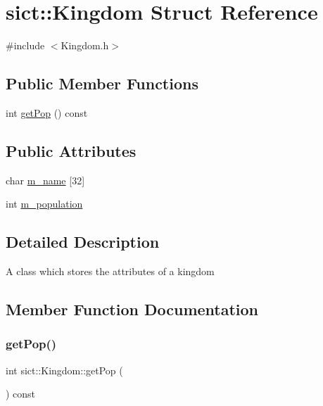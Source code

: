 \hypertarget{structsict_1_1_kingdom}{}\section{sict\+:\+:Kingdom Struct Reference}
\label{structsict_1_1_kingdom}


{\ttfamily \#include $<$Kingdom.\+h$>$}

\subsection*{Public Member Functions}
\begin{DoxyCompactItemize}
\item 
int \mbox{\hyperlink{structsict_1_1_kingdom_a0f681d96604019433912c01ea60cde6e}{get\+Pop}} () const
\end{DoxyCompactItemize}
\subsection*{Public Attributes}
\begin{DoxyCompactItemize}
\item 
char \mbox{\hyperlink{structsict_1_1_kingdom_a1fb836a49142a18ae1dc8b114d7632ef}{m\+\_\+name}} \mbox{[}32\mbox{]}
\item 
int \mbox{\hyperlink{structsict_1_1_kingdom_a78ddd5452f29a4f2df70574dd2d7799c}{m\+\_\+population}}
\end{DoxyCompactItemize}


\subsection{Detailed Description}
A class which stores the attributes of a kingdom 

\subsection{Member Function Documentation}
\mbox{\label{structsict_1_1_kingdom_a0f681d96604019433912c01ea60cde6e}} 
\subsubsection{\texorpdfstring{get\+Pop()}{getPop()}}
{\footnotesize\ttfamily int sict\+::\+Kingdom\+::get\+Pop (\begin{DoxyParamCaption}{ }\end{DoxyParamCaption}) const\hspace{0.3cm}{\ttfamily [inline]}}

